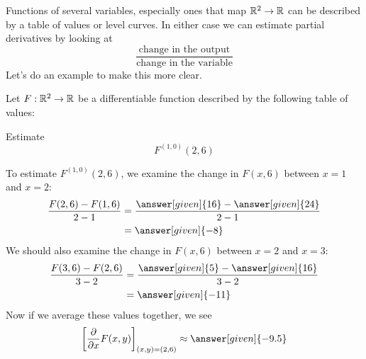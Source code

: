\documentclass{ximera}
\begin{document}
Functions of several variables, especially ones that map $\mathbb R^2\to \mathbb R$
can be described by a table of values or level curves. In either case
we can estimate partial derivatives by looking at
\[
\frac{\text{change in the output}}{\text{change in the variable}}
\]
Let's do an example to make this more clear.
\begin{example}
  Let $F:\mathbb R^2\to\mathbb R$ be a differentiable function described by the
  following table of values:
  \begin{image}
  \end{image}
  Estimate
  \[
  F^{(1,0)}(2,6)
  \]
  \begin{explanation}
    To estimate $F^{(1,0)}(2,6)$, we examine the change in $F(x,6)$
    between $x=1$ and $x=2$:
    \begin{align*}
      \frac{F(2,6)-F(1,6)}{2-1}&= \frac{\answer[given]{16}-\answer[given]{24}}{2-1}\\
      &=\answer[given]{-8}
    \end{align*}
    We should also examine the change in $F(x,6)$ between $x=2$ and
    $x=3$:
    \begin{align*}
      \frac{F(3,6)-F(2,6)}{3-2}&= \frac{\answer[given]{5}-\answer[given]{16}}{3-2}\\
      &=\answer[given]{-11}
    \end{align*}
    Now if we average these values together, we see
    \[
    \eval{\pp{x} F(x,y)}_{(x,y)=(2,6)} \approx \answer[given]{-9.5}
    \]
  \end{explanation}
\end{example}
\end{document}
